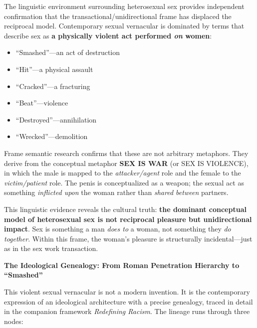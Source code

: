\documentclass[12pt, letterpaper]{article}
\begin{document}
The linguistic environment surrounding heterosexual sex provides independent confirmation that the transactional/unidirectional frame has displaced the reciprocal model. Contemporary sexual vernacular is dominated by terms that describe sex as \textbf{a physically violent act performed \textit{on} women}:

\begin{itemize}
    \item ``Smashed''---an act of destruction
    \item ``Hit''---a physical assault
    \item ``Cracked''---a fracturing
    \item ``Beat''---violence
    \item ``Destroyed''---annihilation
    \item ``Wrecked''---demolition
\end{itemize}

Frame semantic research confirms that these are not arbitrary metaphors. They derive from the conceptual metaphor \textbf{SEX IS WAR} (or SEX IS VIOLENCE), in which the male is mapped to the \textit{attacker/agent} role and the female to the \textit{victim/patient} role. The penis is conceptualized as a weapon; the sexual act as something \textit{inflicted upon} the woman rather than \textit{shared between} partners.

This linguistic evidence reveals the cultural truth: \textbf{the dominant conceptual model of heterosexual sex is not reciprocal pleasure but unidirectional impact}. Sex is something a man \textit{does to} a woman, not something they \textit{do together}. Within this frame, the woman's pleasure is structurally incidental---just as in the sex work transaction.

\textbf{The Ideological Genealogy: From Roman Penetration Hierarchy to ``Smashed''}

This violent sexual vernacular is not a modern invention. It is the contemporary expression of an ideological architecture with a precise genealogy, traced in detail in the companion framework \textit{Redefining Racism}. The lineage runs through three nodes:
\end{document}
